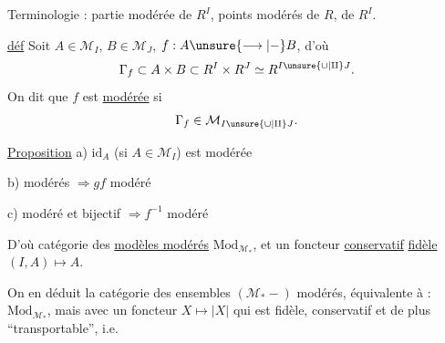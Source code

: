 Terminologie : partie modérée de $R^I$, points modérés de $R$, de $R^I$.

\uline{déf} Soit $A\in\mathcal M_I$, $B\in\mathcal M_J$, $f:A\unsure{\longrightarrow|-}B$, d'où
\[
\Gamma_f\subset A\times B\subset R^I\times R^J\simeq R^{I\unsure{\cup|\amalg}J}.
\]
On dit que $f$ est \uline{modérée} si
\[
\Gamma_f\in\mathcal M_{I\unsure{\cup|\amalg}J}.
\]

\uline{Proposition} a) $\mathrm{id}_A$ (si $A\in\mathcal M_I$) est modérée

b)  modérés $\Longrightarrow gf$ modéré

c)  modéré et bijectif $\Longrightarrow f^{-1}$ modéré

D'où catégorie des \uline{modèles modérés} $\mathrm{Mod}_{\mathcal M_*}$,  et un foncteur \uline{conservatif} \uline{fidèle}
\qquad$(I,A)\longmapsto A$.

On en déduit la catégorie des ensembles  $(\mathcal M_*-)$ modérés, équivalente à : $\mathrm{Mod}_{\mathcal M_*}$, mais avec un foncteur
\qquad$X\longmapsto|X|$
qui est fidèle, conservatif et de plus ``transportable'', i.e.

